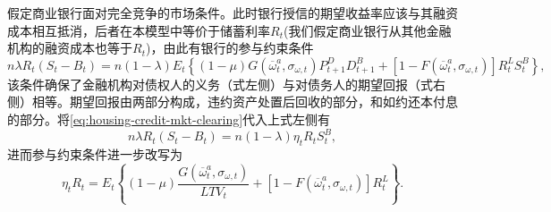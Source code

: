 假定商业银行面对完全竞争的市场条件。此时银行授信的期望收益率应该与其融资成本相互抵消，后者在本模型中等价于储蓄利率$R_{t}$(我们假定商业银行从其他金融机构的融资成本也等于$R_{t}$)，由此有银行的参与约束条件
\begin{equation*}
  n \lambda R_{t} \left( S_{t} - B_{t} \right)
  = n \left( 1 - \lambda \right) E_{t}
  \left\{
  \left(1 - \mu \right) G \left( \overline{\omega}_{t}^{a}, \sigma_{\omega, t} \right) P_{t+1}^{D} D_{t+1}^{B}
  + \left[ 1 - F \left( \overline{\omega}_{t}^{a}, \sigma_{\omega, t} \right) \right] R_{t}^{L} S_{t}^{B}
  \right\},
\end{equation*}
该条件确保了金融机构对债权人的义务（式左侧）与对债务人的期望回报（式右侧）相等。期望回报由两部分构成，违约资产处置后回收的部分，和如约还本付息的部分。将\eqref{eq:housing-credit-mkt-clearing}代入上式左侧有
\begin{equation*}
  n \lambda R_{t} \left( S_{t} - B_{t} \right)
  = n \left( 1 - \lambda \right) \eta_{t} R_{t} S_{t}^{B},
\end{equation*}
进而参与约束条件进一步改写为
\begin{equation}
  \label{eq:housing-bank-participation-constraint}
  \eta_{t} R_{t} = E_{t} \left\{
  \left( 1 - \mu \right) \frac{
  G \left( \overline{\omega}_{t}^{a}, \sigma_{\omega, t} \right)
  }{LTV_{t}}
  + \left[ 1 - F \left( \overline{\omega}_{t}^{a}, \sigma_{\omega, t} \right)
  \right] R_{t}^{L} \right\}.
\end{equation}
